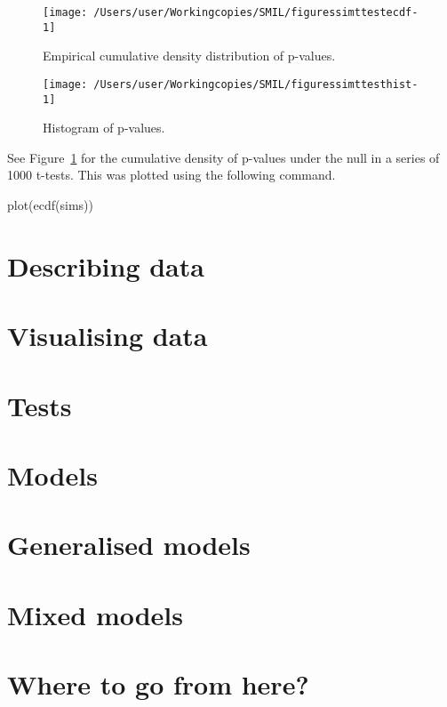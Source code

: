 \documentclass[output=inprep,
  nonflat,
  modfonts,
  showindex,
  draftmode
]{langsci/langscibook}\usepackage[]{graphicx}\usepackage[]{color}
\makeatletter
\def\maxwidth{ %
  \ifdim\Gin@nat@width>\linewidth
    \linewidth
  \else
    \Gin@nat@width
  \fi
}
\makeatother
\begin{document}
\begin{Schunk}
\begin{figure}[H]

{\centering \texttt{[image: /Users/user/Workingcopies/SMIL/figuressimttestecdf-1]} 

}

\caption[Empirical cumulative density distribution of p-values]{Empirical cumulative density distribution of p-values.}\label{fig:simttestecdf}
\end{figure}
\end{Schunk}

\begin{Schunk}
\begin{figure}[H]

{\centering \texttt{[image: /Users/user/Workingcopies/SMIL/figuressimttesthist-1]} 

}

\caption[Histogram of p-values]{Histogram of p-values.}\label{fig:simttesthist}
\end{figure}
\end{Schunk}

See Figure~\ref{fig:simttestecdf} for the cumulative density of p-values under the null in a series of 1000 t-tests.
This was plotted using the following command.

\begin{Schunk}
\begin{Sinput}
plot(ecdf(sims))
\end{Sinput}
\end{Schunk}


\chapter{Describing data}
\label{sec:describingdata}


\chapter{Visualising data}
\label{sec:visualisingdata}


\chapter{Tests}
\label{sec:tests}


\chapter{Models}
\label{sec:models}


\chapter{Generalised models}
\label{sec:generalisedmodels}


\chapter{Mixed models}
\label{sec:mixedmodels}




\chapter{Where to go from here?}
\label{sec:wheretogofromhere}

%  
 
\end{document}
